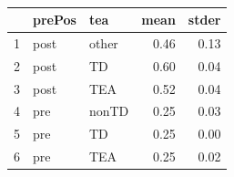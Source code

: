 \documentclass{article}
\begin{document}
\begin{figure}[H]
  \caption{}
  \noindent{}
  \centering
\end{figure}

\begin{table}[ht]
\centering
\caption{}
\begin{tabular}{rllrr}
  \hline
 & prePos & tea & mean & stder \\ 
  \hline
1 & post & other & 0.46 & 0.13 \\ 
  2 & post & TD & 0.60 & 0.04 \\ 
  3 & post & TEA & 0.52 & 0.04 \\ 
  4 & pre & nonTD & 0.25 & 0.03 \\ 
  5 & pre & TD & 0.25 & 0.00 \\ 
  6 & pre & TEA & 0.25 & 0.02 \\ 
   \hline
\end{tabular}
\end{table}
\end{document}
